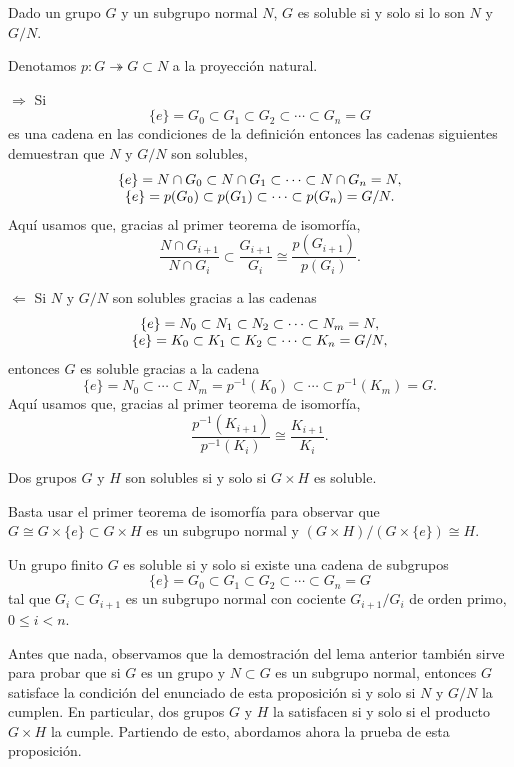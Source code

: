 
Dado un grupo \(G\) y un subgrupo normal \(N\), \(G\) es soluble si y
solo si lo son \(N\) y \(G/N\). 


Denotamos \(p\colon G\twoheadrightarrow G\subset N\) a la proyección
natural.

\(\Rightarrow\) Si
\[\{e\}=G_0 \subset G_1 \subset G_2 \subset \cdots\subset G_n=G\]
es una cadena en las condiciones de la definición entonces las cadenas
siguientes demuestran que \(N\) y \(G/N\) son solubles, \[
\begin{array}{c}
\{e\}=N\cap G_0 \subset N\cap G_1 \subset \cdots\subset N\cap G_n=N,\cr
\{e\}=p(G_0) \subset p(G_1) \subset \cdots\subset p(G_n)=G/N.
\end{array}
\] Aquí usamos que, gracias al primer teorema de isomorfía, \[
\frac{N\cap G_{i+1}}{N\cap G_{i}}\subset\frac{G_{i+1}}{G_i}
\cong\frac{p(G_{i+1})}{p(G_{i})}.
\]

\(\Leftarrow\) Si \(N\) y \(G/N\) son solubles gracias a las cadenas \[
\begin{array}{c}
\{e\}=N_0 \subset N_1 \subset N_2 \subset \cdots\subset N_m=N,\cr
\{e\}=K_0 \subset K_1 \subset K_2 \subset \cdots\subset K_n=G/N,
\end{array}
\] entonces \(G\) es soluble gracias a la cadena \[
\{e\}=N_0 \subset \cdots\subset N_m=p^{-1}(K_0)\subset \cdots\subset p^{-1}(K_m)=G.
\] Aquí usamos que, gracias al primer teorema de isomorfía, \[
\frac{p^{-1}(K_{i+1})}{p^{-1}(K_{i})}\cong \frac{K_{i+1}}{K_i}.
\] 


Dos grupos \(G\) y \(H\) son solubles si y solo si \(G\times H\) es
soluble. 


Basta usar el primer teorema de isomorfía para observar que
\(G\cong G\times \{e\}\subset G\times H\) es un subgrupo normal y
\((G\times H)/(G\times \{e\})\cong H\). 


Un grupo finito \(G\) es soluble si y solo si existe una cadena de
subgrupos
\[\{e\}=G_0 \subset G_1 \subset G_2 \subset \cdots\subset G_n=G\]
tal que \(G_i\subset G_{i+1}\) es un subgrupo normal con cociente
\(G_{i+1}/G_i\) de orden primo, \(0\leq i<n\). 


Antes que nada, observamos que la demostración del lema anterior también
sirve para probar que si \(G\) es un grupo y \(N\subset G\) es un
subgrupo normal, entonces \(G\) satisface la condición del enunciado de
esta proposición si y solo si \(N\) y \(G/N\) la cumplen. En particular,
dos grupos \(G\) y \(H\) la satisfacen si y solo si el producto
\(G\times H\) la cumple. Partiendo de esto, abordamos ahora la prueba de
esta proposición.

